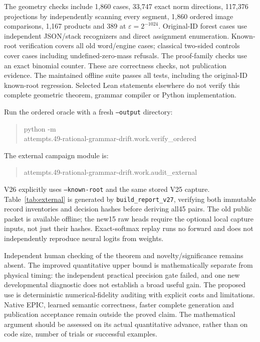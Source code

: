 \documentclass[11pt]{article}
\begin{document}
The geometry checks include 1,860 cases, 33,747 exact norm directions,
117,376 projections by independently scanning every segment, 1,860 ordered
image comparisons, 1,167 products and 389 at $\varepsilon=2^{-1024}$.
Original-ID forest cases use independent JSON/stack recognizers and direct
assignment enumeration. Known-root verification covers all \RootOracleCases{} old
word/engine cases; classical two-sided controls cover \LowerOracleCases{} cases including
\LowerUndefined{} undefined-zero-mass refusals. The \FamilyCases{} proof-family checks use an exact
binomial counter. These are correctness checks, not publication evidence.
The maintained offline suite passes all \MaintainedTests{} tests, including the original-ID
known-root regression. Selected Lean statements elsewhere do not verify this
complete geometric theorem, grammar compiler or Python implementation.

Run the ordered oracle with a fresh \texttt{--output} directory:
\begin{quote}\small\ttfamily
python -m\\
attempts.49-rational-grammar-drift.work.verify\_ordered
\end{quote}
The external campaign module is:
\begin{quote}\small\ttfamily
attempts.49-rational-grammar-drift.work.audit\_external
\end{quote}
V26 explicitly
uses \texttt{--known-root} and the same stored V25 capture. Table~\ref{tab:external}
is generated by \texttt{build\_report\_v27}, verifying both immutable record
inventories and decision hashes before deriving all45 pairs. The old public
packet is available offline; the new15 raw heads require the optional local
capture inputs, not just their hashes. Exact-softmax replay runs no forward
and does not independently reproduce neural logits from weights.

Independent human checking of the theorem and novelty/significance remains
absent. The improved quantitative upper bound is mathematically separate from
physical timing: the independent practical precision gate failed, and one
new developmental diagnostic does not establish a broad useful gain.
The proposed use is deterministic numerical-fidelity auditing with explicit
costs and limitations. Native EPIC, learned semantic correctness, faster
complete generation and publication acceptance remain outside the proved
claim. The mathematical argument should be assessed on its actual quantitative
advance, rather than on code size, number of trials or successful examples.
\end{document}
